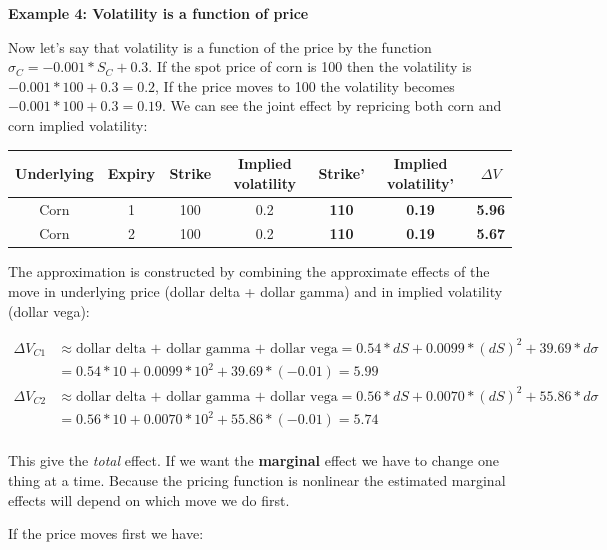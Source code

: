 \textbf{Example 4: Volatility is a function of price}

Now let's say that volatility is a function of the price by the function $\sigma_{C} = -0.001*S_C+0.3$. If the spot price of corn is 100 then the volatility is $-0.001*100+0.3 = 0.2$, If the price moves to 100 the volatility becomes $-0.001*100+0.3 = 0.19$. We can see the joint effect by repricing both corn and corn implied volatility:

\begin{tabular}{|c|c|c|c|c|c|c|}
\hline
Underlying & Expiry & Strike & Implied volatility & Strike' & Implied volatility' & $\Delta V$\\ 
\hline
Corn & 1 & 100 & 0.2 & \textbf{110} & \textbf{0.19} & \textbf{5.96} \\
Corn & 2 & 100 & 0.2& \textbf{110} & \textbf{0.19} & \textbf{5.67} \\
\hline
\end{tabular}

The approximation is constructed by combining the approximate effects of the move in underlying price (dollar delta + dollar gamma) and in implied volatility (dollar vega):

\begin{eqnarray*}
\Delta V_{C1} &\approx \mbox{dollar delta + dollar gamma + dollar vega} = 0.54*dS + 0.0099*(dS)^2 + 39.69*d\sigma \\
 &= 0.54*10+0.0099*10^2 + 39.69*(-0.01) =  5.99\\
\Delta V_{C2} &\approx \mbox{dollar delta + dollar gamma + dollar vega} = 0.56*dS + 0.0070*(dS)^2 + 55.86*d\sigma\\
 &= 0.56*10+0.0070*10^2 + 55.86*(-0.01) = 5.74\\
\end{eqnarray*}

This give the \textit{total} effect. If we want the \textbf{marginal} effect we have to change one thing at a time. Because the pricing function is nonlinear the estimated marginal effects will depend on which move we do first. 

If the price moves first we have:

